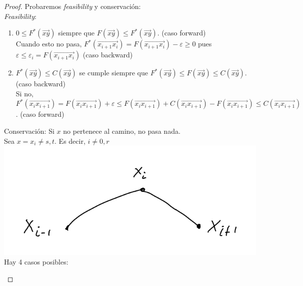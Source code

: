 \begin{proof}
Probaremos \textit{feasibility} y conservación:\\
\textit{Feasibility}: 
\begin{enumerate} 
\item $0 \le F^{*}(\overrightarrow{xy})$ siempre que $F(\overrightarrow{xy}) \le F^{*}(\overrightarrow{xy})$. (caso forward)\\
Cuando esto no pasa,  $F^{*}(\overrightarrow{x_{i+1} x_i}) = F(\overrightarrow{x_{i+1} x_i}) - \varepsilon \ge 0$ pues $\varepsilon \le \varepsilon_{i} = F(\overrightarrow{x_{i+1} x_i})$ (caso backward)
\item $F^{*}(\overrightarrow{xy}) \le C(\overrightarrow{xy})$ se cumple siempre que $F^{*}(\overrightarrow{xy}) \le F(\overrightarrow{xy}) \le C(\overrightarrow{xy})$. (caso backward) \\
Si no, $F^*(\overrightarrow{x_i x_{i+1}}) = F(\overrightarrow{x_i x_{i+1}}) + \varepsilon \le F(\overrightarrow{x_i x_{i+1}}) + C(\overrightarrow{x_i x_{i+1}})- F(\overrightarrow{x_i x_{i+1}}) \le C(\overrightarrow{x_i x_{i+1}})$.  (caso forward)
\end{enumerate}
Conservación:
Si $x$ no pertenece al camino, no pasa nada.\\
Sea $x= x_i \neq s, t$. Es decir, $i \neq 0, r$\\

\includegraphics[scale=0.4]{img/base.png}\\
Hay 4 casos posibles:
\begin{enumerate}


\end{enumerate}
\end{proof}
